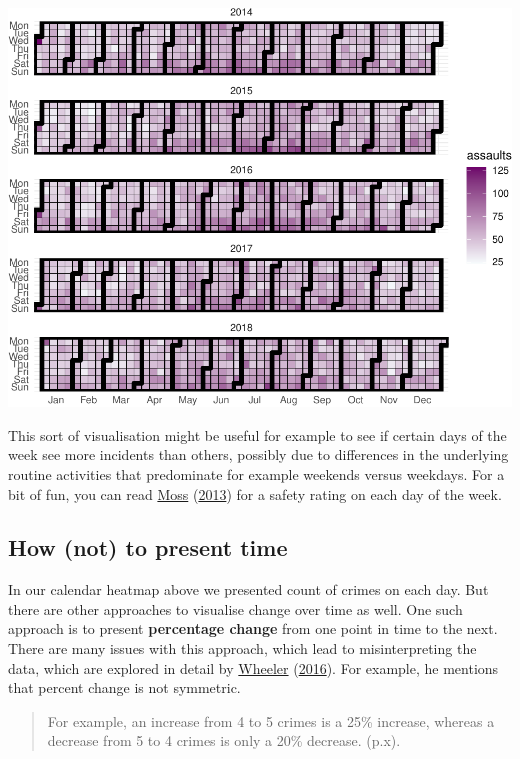\documentclass[
]{book}
\begin{document}
\includegraphics{crime_mapping_files/figure-latex/unnamed-chunk-173-1.pdf}

This sort of visualisation might be useful for example to see if certain days of the week see more incidents than others, possibly due to differences in the underlying routine activities that predominate for example weekends versus weekdays. For a bit of fun, you can read \protect\hyperlink{ref-Moss_2013}{Moss} (\protect\hyperlink{ref-Moss_2013}{2013}) for a safety rating on each day of the week.

\hypertarget{how-not-to-present-time}{%
\subsection{How (not) to present time}\label{how-not-to-present-time}}

In our calendar heatmap above we presented count of crimes on each day. But there are other approaches to visualise change over time as well. One such approach is to present \textbf{percentage change} from one point in time to the next. There are many issues with this approach, which lead to misinterpreting the data, which are explored in detail by \protect\hyperlink{ref-Wheeler_2016}{Wheeler} (\protect\hyperlink{ref-Wheeler_2016}{2016}). For example, he mentions that percent change is not symmetric.

\begin{quote}
For example, an increase from 4 to 5 crimes is a 25\% increase, whereas a decrease from 5 to 4 crimes is only a 20\% decrease. (p.x).
\end{quote}
\end{document}
